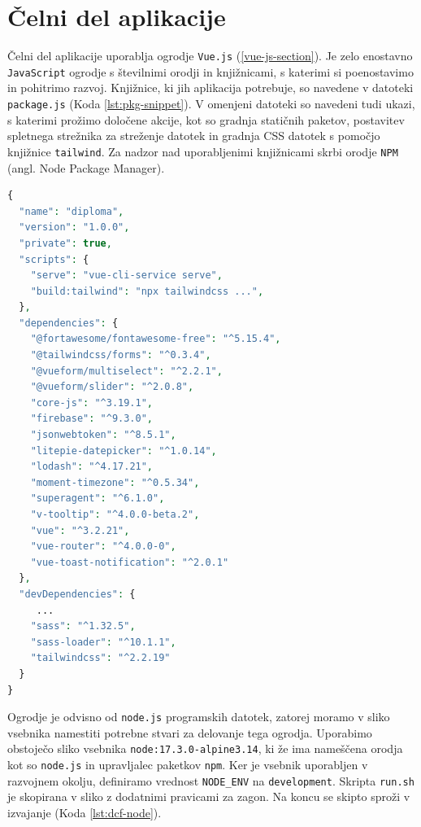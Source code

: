 \documentclass[a4paper, 12pt]{book}
\begin{document}
\section{Čelni del aplikacije}
Čelni del aplikacije uporablja ogrodje \verb=Vue.js= (\ref{vue-js-section}). Je zelo enostavno \verb=JavaScript= ogrodje s številnimi orodji in knjižnicami, s katerimi si poenostavimo in pohitrimo razvoj. Knjižnice, ki jih aplikacija potrebuje, so navedene v datoteki \verb=package.js= (Koda \ref{lst:pkg-snippet}). V omenjeni datoteki so navedeni tudi ukazi, s katerimi prožimo določene akcije, kot so gradnja statičnih paketov, postavitev spletnega strežnika za streženje datotek in gradnja CSS datotek s pomočjo knjižnice \verb=tailwind=. Za nadzor nad uporabljenimi knjižnicami skrbi orodje \verb=NPM= (angl. Node Package Manager).

\begin{lstlisting}[language=php, style=mystyle,caption={Izsek naštetih knjižnic in ukazov v datoteki package.json},label=lst:pkg-snippet]
{
  "name": "diploma",
  "version": "1.0.0",
  "private": true,
  "scripts": {
    "serve": "vue-cli-service serve",
    "build:tailwind": "npx tailwindcss ...",
  },
  "dependencies": {
    "@fortawesome/fontawesome-free": "^5.15.4",
    "@tailwindcss/forms": "^0.3.4",
    "@vueform/multiselect": "^2.2.1",
    "@vueform/slider": "^2.0.8",
    "core-js": "^3.19.1",
    "firebase": "^9.3.0",
    "jsonwebtoken": "^8.5.1",
    "litepie-datepicker": "^1.0.14",
    "lodash": "^4.17.21",
    "moment-timezone": "^0.5.34",
    "superagent": "^6.1.0",
    "v-tooltip": "^4.0.0-beta.2",
    "vue": "^3.2.21",
    "vue-router": "^4.0.0-0",
    "vue-toast-notification": "^2.0.1"
  },
  "devDependencies": {
     ...
    "sass": "^1.32.5",
    "sass-loader": "^10.1.1",
    "tailwindcss": "^2.2.19"
  }
}

\end{lstlisting}



Ogrodje je odvisno od \verb=node.js= programskih datotek, zatorej moramo v sliko vsebnika namestiti potrebne stvari za delovanje tega ogrodja. Uporabimo obstoječo sliko vsebnika \texttt{node:17.3.0-alpine3.14}, ki že ima nameščena orodja kot so \texttt{node.js} in upravljalec paketkov \texttt{npm}. Ker je vsebnik uporabljen v razvojnem okolju, definiramo vrednost \texttt{NODE\_ENV} na \texttt{development}. Skripta \texttt{run.sh} je skopirana v sliko z dodatnimi pravicami za zagon. Na koncu se skipto sproži v izvajanje (Koda \ref{lst:dcf-node}).
\end{document}
